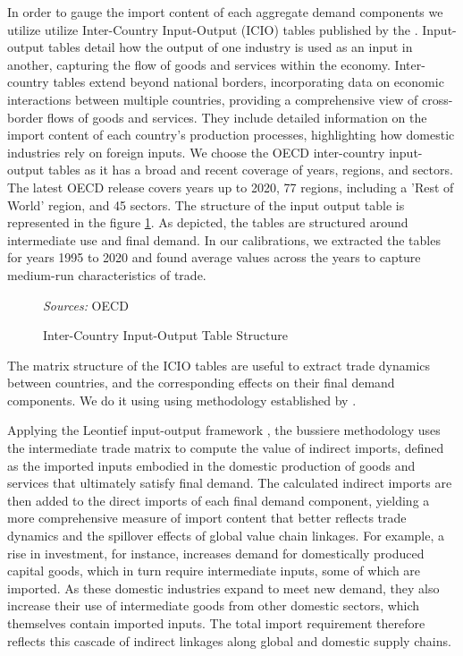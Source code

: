 \documentclass[a4paper,11pt]{article}
\newcommand{\source}[1]{\vspace{2mm} \footnotesize \begin{minipage}{0.9\textwidth} \emph{Sources: }{#1} \end{minipage}}
\numberwithin{equation}{section}
\begin{document}
In order to gauge the import content of each aggregate demand components we utilize utilize Inter-Country Input-Output (ICIO) tables published by the \citet{ICIO2024}. Input-output tables detail how the output of one industry is used as an input in another, capturing the flow of goods and services within the economy.
Inter-country tables extend beyond national borders, incorporating data on economic interactions between multiple countries, providing a comprehensive view of cross-border flows of goods and services.
They include detailed information on the import content of each country's production processes, highlighting how domestic industries rely on foreign inputs.
We choose the OECD inter-country input-output tables as it has a broad and recent coverage of years, regions, and sectors.
The latest OECD release covers years up to 2020, 77 regions, including a 'Rest of World' region, and 45 sectors.
The structure of the input output table is represented in the figure \ref{fig:OECD_table}.
As depicted, the tables are structured around intermediate use and final demand.
In our calibrations, we extracted the tables for years 1995 to 2020 and found average values across the years to capture medium-run characteristics of trade.

\begin{figure}[H]
    \centering
    \caption{Inter-Country Input-Output Table Structure \label{fig:OECD_table}}
    
    \source{OECD}
\end{figure}

The matrix structure of the ICIO tables are useful to extract trade dynamics between countries, and the corresponding effects on their final demand components. We do it using using methodology established by \citet{Bussiere-et-al_2013_aejMacro} .  

Applying the Leontief input-output framework , the bussiere methodology uses the intermediate trade matrix to compute the value of indirect imports, defined as the imported inputs embodied in the domestic production of goods and services that ultimately satisfy final demand. The calculated indirect imports are then added to the direct imports of each final demand component, yielding a more comprehensive measure of import content that better reflects trade dynamics and the spillover effects of global value chain linkages. For example, a rise in investment, for instance, increases demand for domestically produced capital goods, which in turn require intermediate inputs, some of which are imported. As these domestic industries expand to meet new demand, they also increase their use of intermediate goods from other domestic sectors, which themselves contain imported inputs. The total import requirement therefore reflects this cascade of indirect linkages along global and domestic supply chains.
\end{document}
